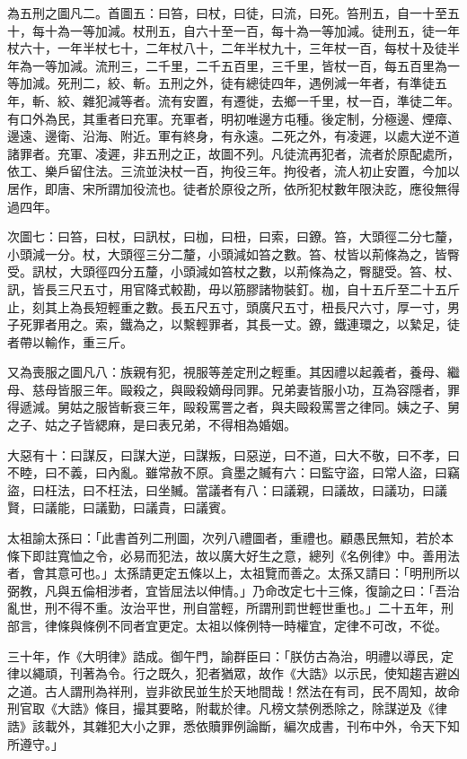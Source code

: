 為五刑之圖凡二。首圖五：曰笞，曰杖，曰徒，曰流，曰死。笞刑五，自一十至五十，每十為一等加減。杖刑五，自六十至一百，每十為一等加減。徒刑五，徒一年杖六十，一年半杖七十，二年杖八十，二年半杖九十，三年杖一百，每杖十及徒半年為一等加減。流刑三，二千里，二千五百里，三千里，皆杖一百，每五百里為一等加減。死刑二，絞、斬。五刑之外，徒有總徒四年，遇例減一年者，有準徒五年，斬、絞、雜犯減等者。流有安置，有遷徙，去鄉一千里，杖一百，準徒二年。有口外為民，其重者曰充軍。充軍者，明初唯邊方屯種。後定制，分極邊、煙瘴、邊遠、邊衛、沿海、附近。軍有終身，有永遠。二死之外，有凌遲，以處大逆不道諸罪者。充軍、凌遲，非五刑之正，故圖不列。凡徒流再犯者，流者於原配處所，依工、樂戶留住法。三流並決杖一百，拘役三年。拘役者，流人初止安置，今加以居作，即唐、宋所謂加役流也。徒者於原役之所，依所犯杖數年限決訖，應役無得過四年。

次圖七：曰笞，曰杖，曰訊杖，曰枷，曰杻，曰索，曰鐐。笞，大頭徑二分七釐，小頭減一分。杖，大頭徑三分二釐，小頭減如笞之數。笞、杖皆以荊條為之，皆臀受。訊杖，大頭徑四分五釐，小頭減如笞杖之數，以荊條為之，臀腿受。笞、杖、訊，皆長三尺五寸，用官降式較勘，毋以筋膠諸物裝釘。枷，自十五斤至二十五斤止，刻其上為長短輕重之數。長五尺五寸，頭廣尺五寸，杻長尺六寸，厚一寸，男子死罪者用之。索，鐵為之，以繫輕罪者，其長一丈。鐐，鐵連環之，以縶足，徒者帶以輸作，重三斤。

又為喪服之圖凡八：族親有犯，視服等差定刑之輕重。其因禮以起義者，養母、繼母、慈母皆服三年。毆殺之，與毆殺嫡母同罪。兄弟妻皆服小功，互為容隱者，罪得遞減。舅姑之服皆斬衰三年，毆殺罵詈之者，與夫毆殺罵詈之律同。姨之子、舅之子、姑之子皆緦麻，是曰表兄弟，不得相為婚姻。

大惡有十：曰謀反，曰謀大逆，曰謀叛，曰惡逆，曰不道，曰大不敬，曰不孝，曰不睦，曰不義，曰內亂。雖常赦不原。貪墨之贓有六：曰監守盜，曰常人盜，曰竊盜，曰枉法，曰不枉法，曰坐贓。當議者有八：曰議親，曰議故，曰議功，曰議賢，曰議能，曰議勤，曰議貴，曰議賓。

太祖諭太孫曰：「此書首列二刑圖，次列八禮圖者，重禮也。顧愚民無知，若於本條下即註寬恤之令，必易而犯法，故以廣大好生之意，總列《名例律》中。善用法者，會其意可也。」太孫請更定五條以上，太祖覽而善之。太孫又請曰：「明刑所以弼教，凡與五倫相涉者，宜皆屈法以伸情。」乃命改定七十三條，復諭之曰：「吾治亂世，刑不得不重。汝治平世，刑自當輕，所謂刑罰世輕世重也。」二十五年，刑部言，律條與條例不同者宜更定。太祖以條例特一時權宜，定律不可改，不從。

三十年，作《大明律》誥成。御午門，諭群臣曰：「朕仿古為治，明禮以導民，定律以繩頑，刊著為令。行之既久，犯者猶眾，故作《大誥》以示民，使知趨吉避凶之道。古人謂刑為祥刑，豈非欲民並生於天地間哉！然法在有司，民不周知，故命刑官取《大誥》條目，撮其要略，附載於律。凡榜文禁例悉除之，除謀逆及《律誥》該載外，其雜犯大小之罪，悉依贖罪例論斷，編次成書，刊布中外，令天下知所遵守。」

